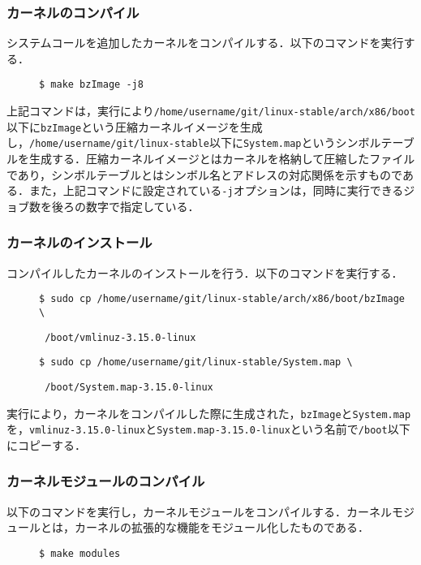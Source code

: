 \documentclass[12pt]{jsarticle}
\begin{document}
\subsubsection{カーネルのコンパイル}
システムコールを追加したカーネルをコンパイルする．以下のコマンドを実行する．
\begin{description}
\item[] \verb|$ make bzImage -j8|
\end{description}
上記コマンドは，実行により\verb|/home/username/git/linux-stable/arch/x86/boot|以下に\verb|bzImage|という圧縮カーネルイメージを生成し，\verb|/home/username/git/linux-stable|以下に\verb|System.map|というシンボルテーブルを生成する．圧縮カーネルイメージとはカーネルを格納して圧縮したファイルであり，シンボルテーブルとはシンボル名とアドレスの対応関係を示すものである．また，上記コマンドに設定されている\verb|-j|オプションは，同時に実行できるジョブ数を後ろの数字で指定している．
\subsubsection{カーネルのインストール}\label{kerin}
コンパイルしたカーネルのインストールを行う．以下のコマンドを実行する．
\begin{description}
\item[] \verb|$ sudo cp /home/username/git/linux-stable/arch/x86/boot/bzImage \|
\item[] \verb| /boot/vmlinuz-3.15.0-linux|
\item[] \verb|$ sudo cp /home/username/git/linux-stable/System.map \|
\item[] \verb| /boot/System.map-3.15.0-linux|
\end{description}
実行により，カーネルをコンパイルした際に生成された，\verb|bzImage|と\verb|System.map|を，\verb|vmlinuz-3.15.0-linux|と\verb|System.map-3.15.0-linux|という名前で\verb|/boot|以下にコピーする．
\subsubsection{カーネルモジュールのコンパイル}
以下のコマンドを実行し，カーネルモジュールをコンパイルする．カーネルモジュールとは，カーネルの拡張的な機能をモジュール化したものである．
\begin{description}
\item[] \verb|$ make modules|
\end{description}
\end{document}
